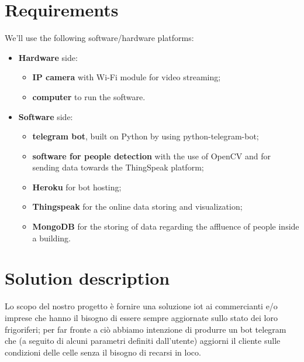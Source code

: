 
\section{Requirements}
We'll use the following software/hardware platforms:
\begin{itemize}
    \item \textbf{Hardware} side:
    \begin{itemize}
        \item \textbf{IP camera} with Wi-Fi module for video streaming;%
        \item \textbf{computer} to run the software.%
    \end{itemize}
    \item \textbf{Software} side:
    \begin{itemize}
        \item \textbf{telegram bot}, built on Python by using python-telegram-bot;
        \item \textbf{software for people detection} with the use of OpenCV and for sending data towards the ThingSpeak platform;%
        \item \textbf{Heroku} for bot hosting;%
        \item \textbf{Thingspeak} for the online data storing and visualization;%
        \item \textbf{MongoDB} for the storing of data regarding the affluence of people inside a building.%
    \end{itemize}
\end{itemize}

\section{Solution description}
Lo scopo del nostro progetto è fornire una soluzione iot ai commercianti e/o imprese che hanno il bisogno di essere sempre aggiornate sullo stato dei loro frigoriferi; per far fronte a ciò abbiamo intenzione di produrre un bot telegram che (a seguito di alcuni parametri definiti dall'utente) aggiorni il cliente sulle condizioni delle celle senza il bisogno di recarsi in loco.
\vspace{3mm}

